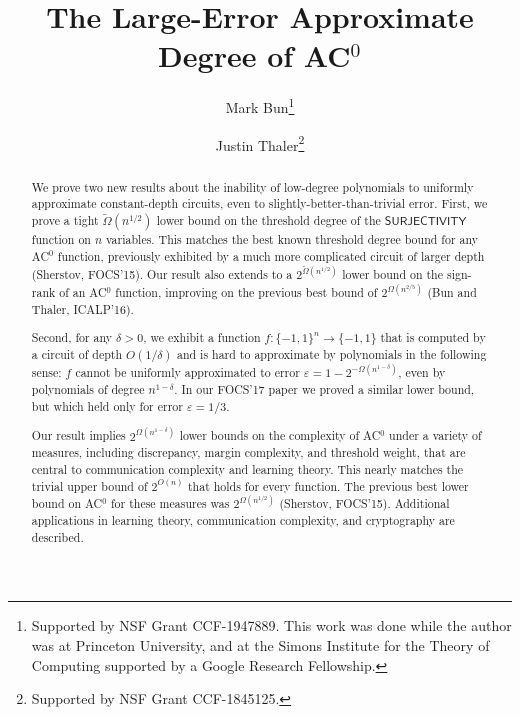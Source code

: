 \documentclass{toc}
\newcommand{\bits}{\{-1,1\}}
\newcommand{\eps}{\varepsilon}
\begin{document}
\begin{frontmatter} %
  
%
%

%
%

  \title{The Large-Error Approximate Degree of
  \texorpdfstring{AC$^0$}{AC0}}

%
%
%
%
%
%
%
%
%
%
%
%


%
%
%
%

%

\author[bun]{Mark Bun\thanks{Supported by NSF Grant CCF-1947889. This work was done while the author was at Princeton University, and at the Simons Institute for the Theory of Computing supported by a Google Research Fellowship.}}
\author[thaler]{Justin Thaler\thanks{Supported by NSF Grant CCF-1845125.}}

%
%
%
%

%
%
%
%
%
%
\begin{abstract}
  We prove two new results about the inability of low-degree polynomials to uniformly approximate 
  constant-depth circuits, even to slightly-better-than-trivial error. 
  First, we prove a tight $\tilde{\Omega}(n^{1/2})$ lower bound on the threshold degree of the $\mathsf{SURJECTIVITY}$ 
  function on $n$ variables. This matches the best known threshold degree bound for any AC$^0$ function,
  previously exhibited by a much more complicated circuit of larger depth (Sherstov, FOCS'15).
  Our result also extends to a $2^{\tilde{\Omega}(n^{1/2})}$ lower bound on the sign-rank of an AC$^0$ function,
  improving on the previous best bound of $2^{\Omega(n^{2/5})}$ (Bun and Thaler, ICALP'16). 
  
  Second, for any $\delta>0$, we exhibit a function $f \colon \bits^n \to \bits$
  that is computed by a circuit of depth $O(1/\delta)$ and is hard to approximate by polynomials in the 
  following sense: $f$ cannot be uniformly approximated to error
  $\eps=1-2^{-\Omega(n^{1-\delta})}$, even by polynomials of degree $n^{1-\delta}$. 
  In our FOCS'17 paper we  %
  proved a similar lower bound, but which held only for error $\eps=1/3$.
  
  Our result implies $2^{\Omega(n^{1-\delta})}$ lower bounds on the complexity of AC$^0$
  under a variety of measures, including discrepancy, margin complexity, and threshold weight, that are central to communication complexity and learning theory. This nearly
  matches the trivial upper bound of $2^{O(n)}$ that holds for every function. The previous best lower bound on AC$^0$
  for these measures was $2^{\Omega(n^{1/2})}$ (Sherstov, FOCS'15). Additional applications in learning theory, communication
  complexity, and cryptography are described.
\end{abstract}

%

\end{frontmatter}
\end{document}
